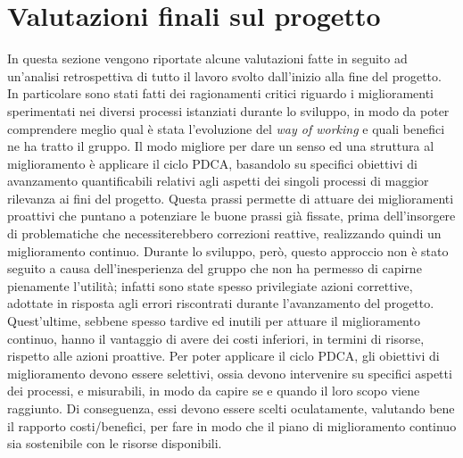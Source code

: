 
\section{Valutazioni finali sul progetto}
	In questa sezione vengono riportate alcune valutazioni fatte in seguito ad un'analisi retrospettiva di tutto il lavoro svolto dall'inizio alla fine del progetto. In particolare sono stati fatti dei ragionamenti critici riguardo i miglioramenti sperimentati nei diversi processi istanziati durante lo sviluppo, in modo da poter comprendere meglio qual è stata l'evoluzione del \textit{way of working} e quali benefici ne ha tratto il gruppo.
	\newline\newline
	Il modo migliore per dare un senso ed una struttura al miglioramento è applicare il ciclo PDCA, basandolo su specifici obiettivi di avanzamento quantificabili relativi agli aspetti dei singoli processi di maggior rilevanza ai fini del progetto. Questa prassi permette di attuare dei miglioramenti proattivi che puntano a potenziare le buone prassi già fissate, prima dell'insorgere di problematiche che necessiterebbero correzioni reattive, realizzando quindi un miglioramento continuo.
	\newline
	Durante lo sviluppo, però, questo approccio non è stato seguito a causa dell'inesperienza del gruppo che non ha permesso di capirne pienamente l'utilità; infatti sono state spesso privilegiate azioni correttive, adottate in risposta agli errori riscontrati durante l'avanzamento del progetto. Quest'ultime, sebbene spesso tardive ed inutili per attuare il miglioramento continuo, hanno il vantaggio di avere dei costi inferiori, in termini di risorse, rispetto alle azioni proattive.
	\newline
	Per poter applicare il ciclo PDCA, gli obiettivi di miglioramento devono essere selettivi, ossia devono intervenire su specifici aspetti dei processi, e misurabili, in modo da capire se e quando il loro scopo viene raggiunto. Di conseguenza, essi devono essere scelti oculatamente, valutando bene il rapporto costi/benefici, per fare in modo che il piano di miglioramento continuo sia sostenibile con le risorse disponibili.
	\newline\newline
	

